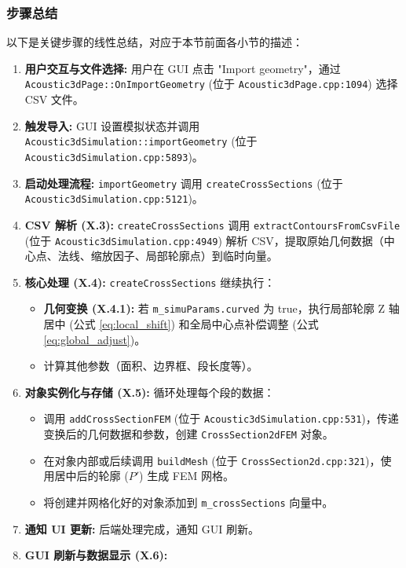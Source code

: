 \documentclass{ctexart}
\begin{document}
\subsubsection{步骤总结}
以下是关键步骤的线性总结，对应于本节前面各小节的描述：
\begin{enumerate}
    \item \textbf{用户交互与文件选择:} 用户在 GUI 点击 "Import geometry"，通过 \texttt{Acoustic3dPage::OnImportGeometry} (位于 \texttt{Acoustic3dPage.cpp:1094}) 选择 CSV 文件。
    \item \textbf{触发导入:} GUI 设置模拟状态并调用 \texttt{Acoustic3dSimulation::importGeometry} (位于 \texttt{Acoustic3dSimulation.cpp:5893})。
    \item \textbf{启动处理流程:} \texttt{importGeometry} 调用 \texttt{createCrossSections} (位于 \texttt{Acoustic3dSimulation.cpp:5121})。
    \item \textbf{CSV 解析 (X.3):} \texttt{createCrossSections} 调用 \texttt{extractContoursFromCsvFile} (位于 \texttt{Acoustic3dSimulation.cpp:4949}) 解析 CSV，提取原始几何数据（中心点、法线、缩放因子、局部轮廓点）到临时向量。
    \item \textbf{核心处理 (X.4):} \texttt{createCrossSections} 继续执行：
        \begin{itemize}
            \item \textbf{几何变换 (X.4.1):} 若 \texttt{m\_simuParams.curved} 为 true，执行局部轮廓 Z 轴居中 (公式 \eqref{eq:local_shift}) 和全局中心点补偿调整 (公式 \eqref{eq:global_adjust})。
            \item 计算其他参数（面积、边界框、段长度等）。
        \end{itemize}
    \item \textbf{对象实例化与存储 (X.5):} 循环处理每个段的数据：
        \begin{itemize}
            \item 调用 \texttt{addCrossSectionFEM} (位于 \texttt{Acoustic3dSimulation.cpp:531})，传递变换后的几何数据和参数，创建 \texttt{CrossSection2dFEM} 对象。
            \item 在对象内部或后续调用 \texttt{buildMesh} (位于 \texttt{CrossSection2d.cpp:321})，使用居中后的轮廓 (\(P'\)) 生成 FEM 网格。
            \item 将创建并网格化好的对象添加到 \texttt{m\_crossSections} 向量中。
        \end{itemize}
    \item \textbf{通知 UI 更新:} 后端处理完成，通知 GUI 刷新。
    \item \textbf{GUI 刷新与数据显示 (X.6):}

\end{enumerate}
\end{document}
